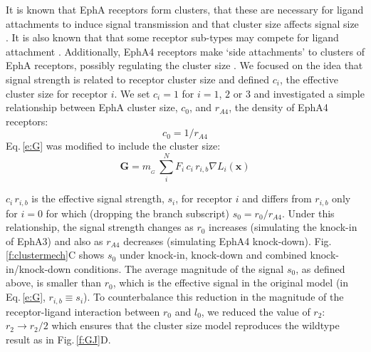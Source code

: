 \documentclass[9pt]{elife} %
\begin{document}
It is known that EphA receptors form clusters, that these are necessary for ligand attachments to induce signal transmission and that cluster size affects signal size \citep{nikolov_ephephrin_2013}. It is also known that that some receptor sub-types may compete for ligand attachment \citep{fiore_regulation_2019}.
Additionally, EphA4 receptors make `side attachments' to clusters of EphA receptors, possibly regulating the cluster size \citep{nikolov_ephephrin_2013}.
%
We focused on the idea that signal strength is related to receptor cluster size and defined $c_i$, the effective cluster size for receptor $i$.
We set $c_i=1$ for $i=1$, $2$ or $3$ and investigated a simple relationship between EphA cluster size, $c_0$, and $r_{\!\scriptscriptstyle A4}$, the density of EphA4 receptors:
\begin{equation}
    c_0 = 1/r_{\!\scriptscriptstyle A4}
\end{equation}
%
Eq.\,\ref{e:G} was modified to include the cluster size:
%
\begin{equation}\label{e:Gcs}
\mathbf{G} = m_{\!_G}\,\sum_i^N F_i\,c_i\,r_{i,b} \nabla L_i(\mathbf{x})
\end{equation}

$c_i\,r_{i,b}$ is the effective signal strength, $s_i$, for receptor $i$ and differs from $r_{i,b}$ only for $i=0$ for which (dropping the branch subscript) $s_0 = r_0/r_{\!\scriptscriptstyle A4}$.
Under this relationship, the signal strength changes as $r_0$ increases (simulating the knock-in of EphA3) and also as $r_{\!\scriptscriptstyle A4}$ decreases (simulating EphA4 knock-down).
Fig.\,\ref{f:clustermech}C shows $s_0$ under knock-in, knock-down and combined knock-in/knock-down conditions.
The average magnitude of the signal $s_0$, as defined above, is smaller than $r_0$, which is the effective signal in the original model (in Eq.\,\ref{e:G}, $r_{i,b} \equiv s_i$). To counterbalance this reduction in the magnitude of the receptor-ligand interaction between $r_0$ and $l_0$, we reduced the value of $r_2$: $r_2 \rightarrow r_2/2$ which ensures that the cluster size model reproduces the wildtype result as in Fig.\,\ref{f:GJ}D.
\end{document}
